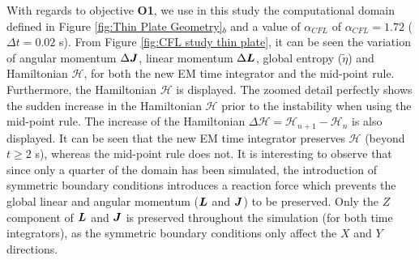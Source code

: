 With regards to objective \textbf{O1}, we use in this study the computational domain defined in Figure \ref{fig:Thin Plate Geometry}$_b$ and a value of $\alpha_{CFL}$ of $\alpha_{CFL}=1.72$ ($\Delta t=0.02$ s). {From Figure \ref{fig:CFL study thin plate}, it can be seen the  variation of angular momentum $\Delta\boldsymbol{J}$, linear momentum $\Delta\boldsymbol{L}$, global entropy ($\tilde{\eta}$) and  Hamiltonian $\mathcal{H}$, for both the new EM time integrator and the mid-point rule}.  Furthermore, the Hamiltonian $\mathcal{H}$ is displayed. {The zoomed detail perfectly shows the sudden increase in the Hamiltonian $\mathcal{H}$ prior to the instability when using the mid-point rule. The increase of the Hamiltonian $\Delta \mathcal{H}={\mathcal{H}_{n+1}-\mathcal{H}_n}$ is also displayed. It can be seen that the new EM time integrator preserves $\mathcal{H}$ (beyond $t\geq 2$ s), whereas the mid-point rule does not.} It is interesting to observe that since only a quarter of the domain has been simulated, the introduction of symmetric boundary conditions introduces a reaction force which prevents the global linear and angular momentum ($\boldsymbol{L}$ and $\boldsymbol{J}$)  to be preserved. Only the $Z$ component of $\boldsymbol{L}$ and $\boldsymbol{J}$ is preserved throughout the simulation (for both time integrators), as the symmetric boundary conditions only affect the $X$ and $Y$ directions. 


